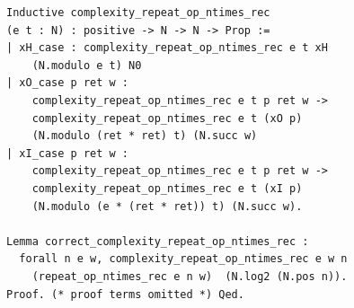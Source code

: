 \documentclass[sigconf,anonymous,review]{acmart}
\begin{document}
\begin{lstlisting}[frame=single, language=Coq, caption={Extractor Complexity},
  label={extractor_complex},captionpos=t, basicstyle=\ttfamily\footnotesize,
  abovecaptionskip=-\medskipamount]
Inductive complexity_repeat_op_ntimes_rec 
(e t : N) : positive -> N -> N -> Prop :=
| xH_case : complexity_repeat_op_ntimes_rec e t xH 
    (N.modulo e t) N0
| xO_case p ret w : 
    complexity_repeat_op_ntimes_rec e t p ret w ->
    complexity_repeat_op_ntimes_rec e t (xO p) 
    (N.modulo (ret * ret) t) (N.succ w)
| xI_case p ret w : 
    complexity_repeat_op_ntimes_rec e t p ret w ->
    complexity_repeat_op_ntimes_rec e t (xI p) 
    (N.modulo (e * (ret * ret)) t) (N.succ w).

Lemma correct_complexity_repeat_op_ntimes_rec : 
  forall n e w, complexity_repeat_op_ntimes_rec e w n 
    (repeat_op_ntimes_rec e n w)  (N.log2 (N.pos n)).
Proof. (* proof terms omitted *) Qed.
\end{lstlisting}
\end{document}
